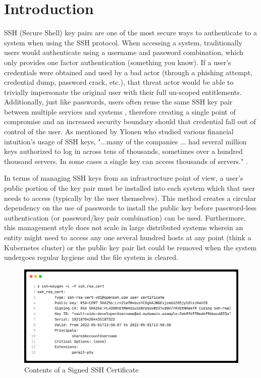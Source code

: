 \documentclass[conference]{IEEEtran}
\begin{document}
\section{Introduction}
SSH (Secure Shell) key pairs are one of the most secure ways to authenticate to a system when using the SSH protocol. When accessing a system, traditionally users would authenticate using a username and password combination, which only provides one factor authentication (something you know). If a user’s credentials were obtained and used by a bad actor (through a phishing attempt, credential dump, password crack, etc.), that threat actor would be able to trivially impersonate the original user with their full un-scoped entitlements. Additionally, just like passwords, users often reuse the same SSH key pair between multiple services and systems \cite{yolen}, therefore creating a single point of compromise and an increased security boundary should that credential fall out of control of the user. As mentioned by Ylonen who studied various financial intuition's usage of SSH keys, "...many of the companies ... had several million keys authorized to log in across tens of thousands, sometimes over a hundred thousand servers. In some cases a single key can access thousands of servers." \cite{yolen}.

In terms of managing SSH keys from an infrastructure point of view, a user’s public portion of the key pair must be installed into each system which that user needs to access (typically by the user themselves). This method creates a circular dependency on the use of passwords to install the public key before password-less authentication (or password/key pair combination) can be used. Furthermore, this management style does not scale in large distributed systems wherein an entity might need to access any one several hundred hosts at any point (think a Kubernetes cluster) or the public key pair list could be removed when the system undergoes regular hygiene and the file system is cleared. 

\begin{figure}
\centerline{\includegraphics[width=\columnwidth,keepaspectratio]{keypair.png}}
\caption{Contents of a Signed SSH Certificate}
\label{fig:Keypair}
\end{figure}
\end{document}
